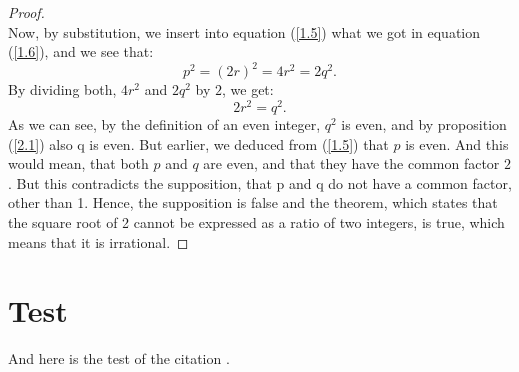 \documentclass[11pt]{amsart}
\theoremstyle{definition}
\begin{document}
\begin{proof}
\begin{equation}
\end{equation}
Now, by substitution, we insert into equation (\ref{1.5}) what we got in equation (\ref{1.6}), and we see that: 
\begin{equation}\label{1.7}
    p^{2} = (2r)^{2} = 4r^{2} = 2q^{2}.
\end{equation}
By dividing both, \(4r^{2}\) and \(2q^{2}\) by \(2\), we get: 
\begin{equation}\label{1.8}
    2r^{2} = q^{2}.
\end{equation}
As we can see, by the definition of an even integer, \(q^{2}\) is even, and by proposition (\ref{2.1}) also q is even. But earlier, we deduced from (\ref{1.5}) that \(p\) is even. And this would mean, that both \(p\) and \(q\) are even, and that they have the common factor \(2\). But this contradicts the supposition, that p and q do not have a common factor, other than 1. Hence, the supposition is false and the theorem, which states that the square root of 2 cannot be expressed as a ratio of two integers, is true, which means that it is irrational.
\end{proof}
\section{Test}
And here is the test of the citation \cite[345-347]{epp_discrete_2020}.
\printbibliography
\end{document}
